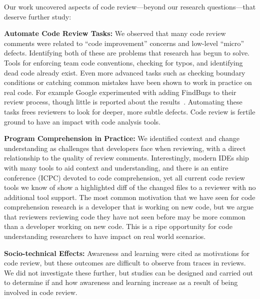 Our work uncovered aspects of code review---beyond our research questions---that deserve further study:

\textbf{Automate Code Review Tasks:} We observed that many code review comments were related to ``code improvement'' concerns and low-level ``micro'' defects. Identifying both of these are problems that research has begun to solve. Tools for enforcing team code conventions, checking for typos, and identifying dead code already exist. Even more advanced tasks such as checking boundary conditions or catching common mistakes have been shown to work in practice on real code. For example Google experimented with adding FindBugs to their review process, though little is reported about the results~\cite{ayewah2007using}. Automating these tasks frees reviewers to look for deeper, more subtle defects. Code review is fertile ground to have an impact with code analysis tools.

\textbf{Program Comprehension in Practice:} We identified context and change understanding as challenges that developers face when reviewing, with a direct relationship to the quality of review comments. Interestingly, modern IDEs ship with many tools to aid context and understanding, and there is an entire conference (ICPC) devoted to code comprehension, yet all current code review tools we know of show a highlighted diff of the changed files to a reviewer with no additional tool support. The most common motivation that we have seen for code comprehension research is a developer that is working on new code, but we argue that reviewers reviewing code they have not seen before may be more common than a developer working on new code. This is a ripe opportunity for code understanding researchers to have impact on real world scenarios.

\textbf{Socio-technical Effects:} Awareness and learning were cited as motivations for code review, but these outcomes are difficult to observe from traces in reviews. We did not investigate these further, but studies can be designed and carried out to determine if and how awareness and learning increase as a result of being involved in code review.

